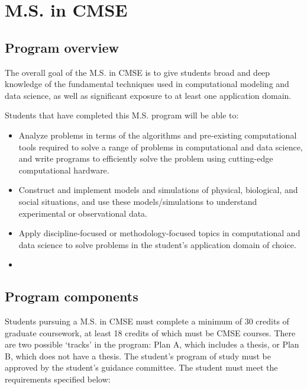 \section{M.S. in CMSE}
\label{sec:ms}

\subsection{Program overview}


The overall goal of the M.S. in CMSE is to give students broad and
deep knowledge of the fundamental techniques used in computational
modeling and data science, as well as significant exposure to at least
one application domain.

Students that have completed this M.S. program will be able to:

\begin{itemize}
\item  Analyze problems in terms of the algorithms and pre-existing
  computational tools required to solve a range of problems in
  computational and data science, and write programs to efficiently
  solve the problem using cutting-edge computational hardware.  

\item  Construct and implement models and simulations of physical,
  biological, and social situations, and use these models/simulations
  to understand experimental or observational data.  

\item  Apply discipline-focused or methodology-focused topics in
  computational and data science to solve problems in the student’s
  application domain of choice.

\item  {}

\end{itemize}

\subsection{Program components}

Students pursuing a M.S. in CMSE must complete a minimum of 30 credits
of graduate coursework, at least 18 credits of which must be CMSE
courses. There are two possible `tracks' in the program: Plan A, which
includes a thesis, or Plan B, which does not have a thesis. The
student’s program of study must be approved by the student’s guidance
committee. The student must meet the requirements specified below:

